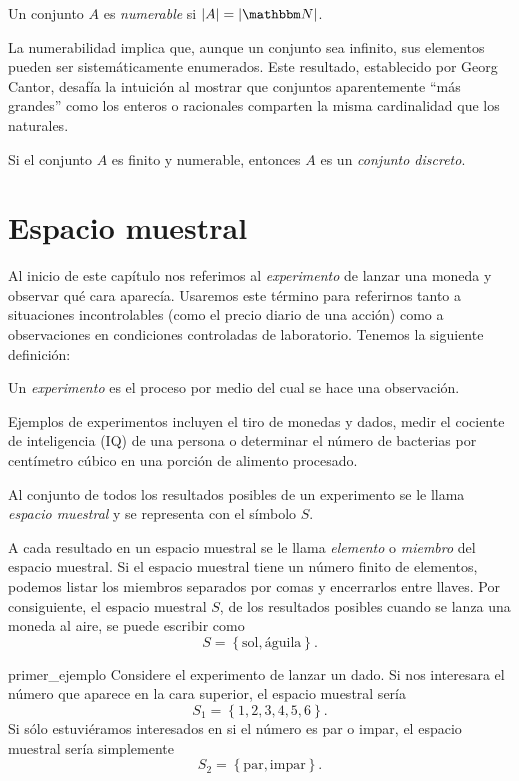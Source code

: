 \begin{definicion}{}{}
    Un conjunto $A$ es \emph{numerable} si $|A| = |\NN|$.
\end{definicion}

La numerabilidad implica que, aunque un conjunto sea infinito, sus elementos pueden ser sistemáticamente enumerados. Este resultado, establecido por Georg Cantor, desafía la intuición al mostrar que conjuntos aparentemente “más grandes” como los enteros o racionales comparten la misma cardinalidad que los naturales.

\begin{definicion}{}{}
    Si el conjunto $A$ es finito y numerable, entonces $A$ es un \emph{conjunto discreto}.
\end{definicion}

\section{Espacio muestral}

Al inicio de este capítulo nos referimos al \emph{experimento} de lanzar una moneda y observar qué cara aparecía. Usaremos este término para referirnos tanto a situaciones incontrolables (como el precio diario de una acción) como a observaciones en condiciones controladas de laboratorio. Tenemos la siguiente definición:

\newpage

\begin{definicion}{}{}
    Un \emph{experimento} es el proceso por medio del cual se hace una observación.
\end{definicion}

Ejemplos de experimentos incluyen el tiro de monedas y dados, medir el cociente de inteligencia (IQ) de una persona o determinar el número de bacterias por centímetro cúbico en una porción de alimento procesado.

\begin{definicion}{}{}
    Al conjunto de todos los resultados posibles de un experimento se le llama \emph{espacio muestral} y se representa con el símbolo $S$.
\end{definicion}

A cada resultado en un espacio muestral se le llama \emph{elemento} o \emph{miembro} del espacio muestral. Si el espacio muestral tiene un número finito de elementos, podemos listar los miembros separados por comas y encerrarlos entre llaves. Por consiguiente, el espacio muestral $S$, de los resultados posibles cuando se lanza una moneda al aire, se puede escribir como
$$S = \left\{ \text{sol}, \text{águila} \right\} .$$
\begin{examplebox}{}{primer_ejemplo}
    Considere el experimento de lanzar un dado. Si nos interesara el número que aparece en la cara superior, el espacio muestral sería
    $$S_1 = \left\{ 1, 2, 3, 4, 5, 6 \right\}.$$
    Si sólo estuviéramos interesados en si el número es par o impar, el espacio muestral sería simplemente
    $$S_2 = \left\{ \text{par}, \text{impar} \right\}.$$
\end{examplebox}

